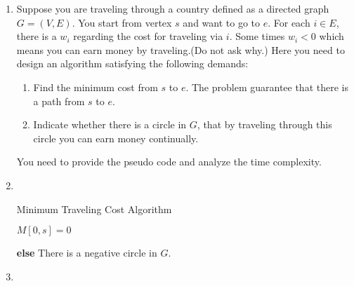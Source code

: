\documentclass[12pt,a4paper]{article}
\makeatletter
\newtheorem*{solution}{Solution}
\theoremstyle{definition}
\renewenvironment{solution}[1][Solution] {\par\pushQED{\qed}\normalfont\topsep6\p@\@plus6\p@\relax\trivlist\item[\hskip\labelsep\bfseries#1\@addpunct{.}]\ignorespaces}{\popQED\endtrivlist\@endpefalse} \makeatother
\makeatother
\begin{document}
\begin{enumerate}
\item
   Suppose you are traveling through a country defined as a directed graph $G=(V,E)$. You start from vertex $s$ and want to go to $e$. For each $i\in E$, there is a $w_i$ regarding the cost for traveling via $i$. Some times $w_i<0$ which means you can earn money by traveling.(Do not ask why.) Here you need to design an algorithm satisfying the following demands:\par
   \begin{enumerate}
   \item Find the minimum cost from $s$ to $e$. The problem guarantee that there is a path from $s$ to $e$.\par
   \item Indicate whether there is a circle in $G$, that by traveling through this circle you can earn money continually.\par
   \end{enumerate}
   You need to provide the pseudo code and analyze the time complexity.\par

\begin{solution}
~\\
	\begin{algorithm}[H]
	\BlankLine
	\caption{Minimum Traveling Cost Algorithm}
	\label{Alg-selectionsort}
	\BlankLine
	$M[0,s]=0$
	
	
\textbf{else} {There is a negative circle in $G$.}
	

\end{algorithm}
\end{solution}
\item


\end{enumerate}
\end{document}
